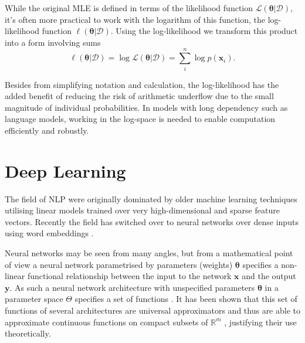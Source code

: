 While the original MLE is defined in terms of the likelihood function
$\mathcal{L}(\bm{\theta}| \mathcal{D})$, it's often more practical to work with
the logarithm of this function, the log-likelihood function $\ell(\bm{\theta} |
\mathcal{D})$. Using the log-likelihood we transform this product into a form involving sums
\begin{equation}
  \label{eq:loglikelihood}
  \ell(\bm{\theta} | \mathcal{D}) = \log \mathcal{L}(\bm{\theta} | \mathcal{D}) = \sum_i^n \log p(\bm{x}_i).
\end{equation} \cite{CaseBerg:01}

Besides from simplifying notation and calculation, the log-likelihood has the added benefit of
reducing the risk of arithmetic underflow due to the small magnitude of
individual probabilities. In models with long dependency such as language
models, working in the log-space is needed to enable computation efficiently and
robustly.

\section{Deep Learning}
The field of NLP were originally dominated by older machine learning
techniques utilising linear models trained over very high-dimensional and sparse
feature vectors. Recently the field has switched over to neural networks over
dense inputs using word embeddings \cite[p.~1 - 2]{goldberg2015primer}.

Neural networks may be seen from many angles, but from a mathematical point of
view a neural network parametrised by parameters (weights) $\bm{\theta}$
specifies a non-linear functional relationship between the input to the network $\bm{x}$
and the output $\bm{y}$. As such a neural network architecture with unspecified parameters
$\bm{\theta}$ in a parameter space $\Theta$ specifies a set of functions
\cite{Bishop:2006}. It has been shown that this set of functions of several
architectures are universal approximators and thus are able to approximate
continuous functions on compact subsets of $\mathbb{R}^m$ \cite{Hornik:1989:MFN:70405.70408, Cybenko1989univapprox},
justifying their use theoretically.

